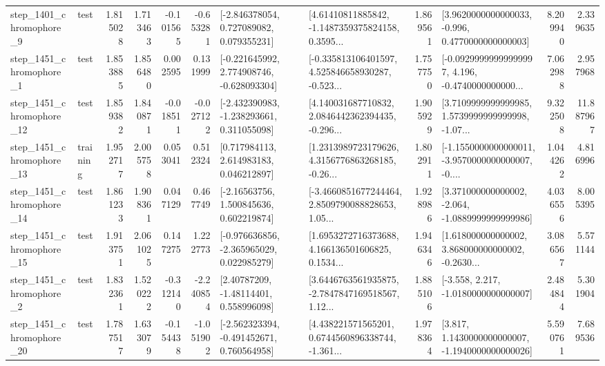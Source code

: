 \begin{tabular}{llrrrrllrlrr}
  step\_1401\_chromophore\_9 &      test &      1.815028 &    1.713463 &     -0.101565 & -0.653281 &    [-2.846378054, 0.727089082, 0.079355231] &  [4.61410811885842, -1.1487359375824158, 0.3595... &       1.869561 &   [3.9620000000000033, -0.996, 0.4770000000000003] &            8.209940 &          2.339635 \\
  step\_1451\_chromophore\_1 &      test &      1.853885 &    1.856480 &      0.002595 &  0.131999 &   [-0.221645992, 2.774908746, -0.628093304] &  [-0.335813106401597, 4.525846658930287, -0.523... &       1.757750 &  [-0.09299999999999997, 4.196, -0.4740000000000... &            7.062988 &          2.957968 \\
 step\_1451\_chromophore\_12 &      test &      1.859382 &    1.840871 &     -0.018511 & -0.027122 &   [-2.432390983, -1.238293661, 0.311055098] &  [4.140031687710832, 2.0846442362394435, -0.296... &       1.905929 &  [3.7109999999999985, 1.5739999999999998, -1.07... &            9.322508 &         11.887967 \\
 step\_1451\_chromophore\_13 &  training &      1.952717 &    2.005758 &      0.053041 &  0.512324 &     [0.717984113, 2.614983183, 0.046212897] &  [1.2313989723179626, 4.3156776863268185, -0.26... &       1.802911 &  [-1.1550000000000011, -3.9570000000000007, -0.... &            1.044262 &          4.816996 \\
 step\_1451\_chromophore\_14 &      test &      1.861233 &    1.908361 &      0.047129 &  0.467749 &     [-2.16563756, 1.500845636, 0.602219874] &  [-3.4660851677244464, 2.8509790088828653, 1.05... &       1.928986 &   [3.371000000000002, -2.064, -1.0889999999999986] &            4.036556 &          8.005395 \\
 step\_1451\_chromophore\_15 &      test &      1.913751 &    2.061025 &      0.147275 &  1.222773 &   [-0.976636856, -2.365965029, 0.022985279] &  [1.6953272716373688, 4.166136501606825, 0.1534... &       1.946346 &  [1.618000000000002, 3.868000000000002, -0.2630... &            3.086567 &          5.571144 \\
  step\_1451\_chromophore\_2 &      test &      1.832361 &    1.520222 &     -0.312140 & -2.240854 &      [2.40787209, -1.48114401, 0.558996098] &  [3.6446763561935875, -2.7847847169518567, 1.12... &       1.885106 &               [-3.558, 2.217, -1.0180000000000007] &            2.484844 &          5.301904 \\
 step\_1451\_chromophore\_20 &      test &      1.787517 &    1.633079 &     -0.154438 & -1.051902 &   [-2.562323394, -0.491452671, 0.760564958] &  [4.438221571565201, 0.6744560896338744, -1.361... &       1.978364 &   [3.817, 1.1430000000000007, -1.1940000000000026] &            5.590761 &          7.689536 \\

\end{tabular}
